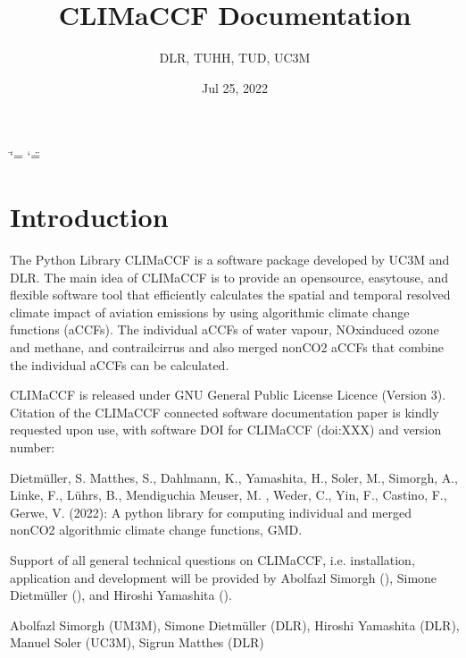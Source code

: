 \documentclass[a4paper,11pt,english]{sphinxmanual}
\title{CLIMaCCF Documentation}
\date{Jul 25, 2022}
\author{DLR, TUHH, TUD, UC3M}
\begin{document}
\ifdefined\shorthandoff
  \ifnum\catcode`\=\string=\active\shorthandoff{=}\fi
  \ifnum\catcode`\"=\active{}\fi
\fi

\pagestyle{empty}
\sphinxmaketitle
\pagestyle{plain}
\sphinxtableofcontents
\pagestyle{normal}
\label{\detokenize{index::doc}}



\chapter{Introduction}
\label{\detokenize{index:introduction}}
 The Python Library CLIMaCCF is a software package developed by UC3M and DLR. The main idea of CLIMaCCF is to provide an open\sphinxhyphen{}source, easy\sphinxhyphen{}to\sphinxhyphen{}use, and flexible software tool that efficiently calculates the spatial and temporal resolved climate impact of aviation emissions by using algorithmic climate change functions (aCCFs). The individual aCCFs of water vapour, NOx\sphinxhyphen{}induced ozone and methane, and contrail\sphinxhyphen{}cirrus and also merged non\sphinxhyphen{}CO2 aCCFs that combine the individual aCCFs can be calculated.

 CLIMaCCF is released under GNU General Public License Licence (Version 3). Citation of the CLIMaCCF connected software documentation paper is kindly requested upon use, with software DOI for CLIMaCCF (doi:XXX) and version number:

 Dietmüller, S. Matthes, S., Dahlmann, K., Yamashita, H., Soler, M., Simorgh, A., Linke, F., Lührs, B., Mendiguchia Meuser, M. , Weder, C., Yin, F., Castino, F., Gerwe, V. (2022): A python library for computing individual and merged non\sphinxhyphen{}CO2 algorithmic climate change functions, GMD.

 Support of all general technical questions on CLIMaCCF, i.e. installation, application and development will be provided by Abolfazl Simorgh (), Simone Dietmüller (), and Hiroshi Yamashita ().

 Abolfazl Simorgh (UM3M), Simone Dietmüller (DLR), Hiroshi Yamashita (DLR), Manuel Soler (UC3M), Sigrun Matthes (DLR)
\end{document}
